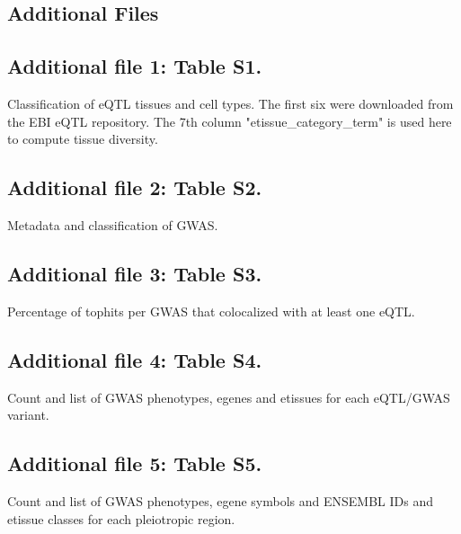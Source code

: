 \begin{backmatter}
    


    \section*{Additional Files}
    \subsection*{Additional file 1: Table S1.}
    Classification of eQTL tissues and cell types. The first six were downloaded from the EBI eQTL repository.
    The 7th column "etissue\_category\_term" is used here to compute tissue diversity.

    \subsection*{Additional file 2: Table S2.}
    Metadata and classification of GWAS.

    \subsection*{Additional file 3: Table S3.}
    Percentage of tophits per GWAS that colocalized with at least one eQTL.

    \subsection*{Additional file 4: Table S4.}
    Count and list of GWAS phenotypes, egenes and etissues for each eQTL/GWAS variant.

    \subsection*{Additional file 5: Table S5.}
    Count and list of GWAS phenotypes, egene symbols and ENSEMBL IDs and etissue classes for each pleiotropic region.

\end{backmatter}
